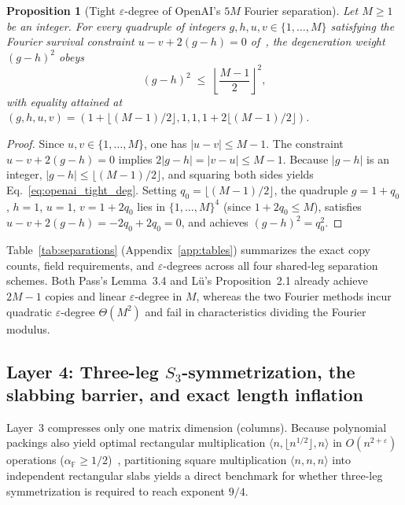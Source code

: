 \documentclass[11pt,a4paper]{article}
\theoremstyle{plain}
\newtheorem{proposition}[theorem]{Proposition}
\theoremstyle{definition}
\theoremstyle{remark}
\newcommand{\F}{\mathbb{F}}
\begin{document}
\begin{proposition}[Tight $\varepsilon$-degree of OpenAI's $5M$ Fourier separation]
\label{prop:openai_5m_tight}
Let $M \ge 1$ be an integer. For every quadruple of integers $g, h, u, v \in \{1, \dots, M\}$ satisfying the Fourier survival constraint $u - v + 2(g - h) = 0$ of~\cite[Eq.~(3.2)]{OpenAI2026Upper}, the degeneration weight $(g - h)^2$ obeys
\begin{equation}
    (g - h)^2 \;\le\; \left\lfloor \frac{M - 1}{2} \right\rfloor^2 ,
    \label{eq:openai_tight_deg}
\end{equation}
with equality attained at $(g, h, u, v) = (1 + \lfloor (M - 1)/2\rfloor, 1, 1, 1 + 2\lfloor (M - 1)/2\rfloor)$.
\end{proposition}
\begin{proof}
Since $u, v \in \{1, \dots, M\}$, one has $|u - v| \le M - 1$. The constraint $u - v + 2(g - h) = 0$ implies $2|g - h| = |v - u| \le M - 1$. Because $|g - h|$ is an integer, $|g - h| \le \lfloor (M - 1)/2 \rfloor$, and squaring both sides yields Eq.~\eqref{eq:openai_tight_deg}. Setting $q_0 = \lfloor (M - 1)/2 \rfloor$, the quadruple $g = 1 + q_0$, $h = 1$, $u = 1$, $v = 1 + 2 q_0$ lies in $\{1, \dots, M\}^4$ (since $1 + 2 q_0 \le M$), satisfies $u - v + 2(g - h) = -2 q_0 + 2 q_0 = 0$, and achieves $(g - h)^2 = q_0^2$.
\end{proof}

Table~\ref{tab:separations} (Appendix~\ref{app:tables}) summarizes the exact copy counts, field requirements, and $\varepsilon$-degrees across all four shared-leg separation schemes. Both Pass's Lemma~3.4 and L\"u's Proposition~2.1 already achieve $2M - 1$ copies and linear $\varepsilon$-degree in $M$, whereas the two Fourier methods incur quadratic $\varepsilon$-degree $\Theta(M^2)$ and fail in characteristics dividing the Fourier modulus.

\subsection{Layer 4: Three-leg \texorpdfstring{$S_3$}{S3}-symmetrization, the slabbing barrier, and exact length inflation}
\label{subsec:layer4}

Layer~3 compresses only one matrix dimension (columns). Because polynomial packings also yield optimal rectangular multiplication $\langle n, \lfloor n^{1/2}\rfloor, n\rangle$ in $O(n^{2+\varepsilon})$ operations ($\alpha_{\F} \ge 1/2$)~\cite{Uznanski2026,Amanov2026}, partitioning square multiplication $\langle n, n, n\rangle$ into independent rectangular slabs yields a direct benchmark for whether three-leg symmetrization is required to reach exponent $9/4$.
\end{document}
